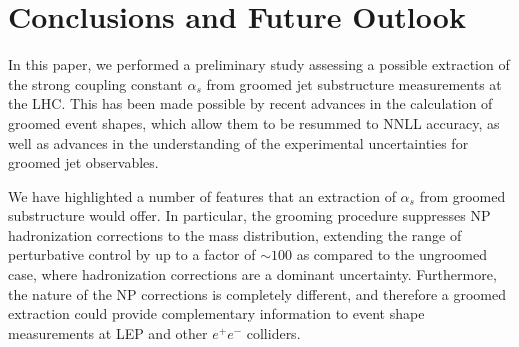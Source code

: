 \documentclass[11pt,letterpaper]{article}
\newcommand{\info}[1]{\textbf{\textcolor{mildred}{(#1)}}}
\begin{document}
%


%


%

\clearpage

\section{Conclusions and Future Outlook}
\label{sec:future}

In this paper, we performed a preliminary study assessing a possible extraction of the strong coupling constant $\alpha_s$ from groomed jet substructure measurements at the LHC.
%
This has been made possible by recent advances in the calculation of groomed event shapes, which allow them to be resummed to NNLL accuracy, as well as advances in the understanding of the experimental uncertainties for groomed jet observables.
 
We have highlighted a number of features that an extraction of $\alpha_s$ from groomed substructure would offer.
%
In particular, the grooming procedure suppresses NP hadronization corrections to the mass distribution, extending the range of perturbative control by up to a factor of $\sim 100$ as compared to the ungroomed case, where hadronization corrections are a dominant uncertainty.
%
Furthermore, the nature of the NP corrections is completely different, and therefore a groomed extraction could provide complementary information to event shape measurements at LEP and other $e^+e^-$ colliders. 
\end{document}
